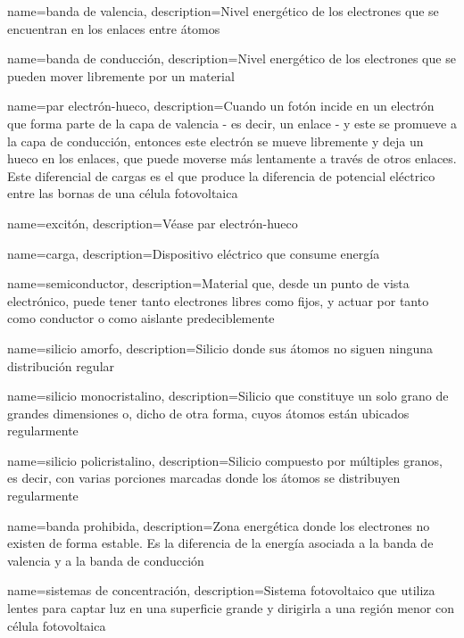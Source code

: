 {
    name={banda de valencia},
    description={Nivel energético de los electrones que se encuentran en los enlaces entre átomos}
}

{
    name={banda de conducción},
    description={Nivel energético de los electrones que se pueden mover libremente por un material}
}

{
    name={par electrón-hueco},
    description={Cuando un fotón incide en un electrón que forma parte de la capa de valencia - es decir, un enlace - y este se promueve a la capa de conducción, entonces este electrón se mueve libremente y deja un hueco en los enlaces, que puede moverse más lentamente a través de otros enlaces. Este diferencial de cargas es el que produce la diferencia de potencial eléctrico entre las bornas de una célula fotovoltaica}
}

{
    name={excitón},
    description={Véase \Gls{par electrón-hueco}}
}

{
    name={carga},
    description={Dispositivo eléctrico que consume energía}
}

{
    name={semiconductor},
    description={Material que, desde un punto de vista electrónico, puede tener tanto electrones libres como fijos, y actuar por tanto como conductor o como aislante predeciblemente}
}

{
    name={silicio amorfo},
    description={Silicio donde sus átomos no siguen ninguna distribución regular}
}

{
    name={silicio monocristalino},
    description={Silicio que constituye un solo grano de grandes dimensiones o, dicho de otra forma, cuyos átomos están ubicados regularmente}
}

{
    name={silicio policristalino},
    description={Silicio compuesto por múltiples granos, es decir, con varias porciones marcadas donde los átomos se distribuyen regularmente}
}

{
    name={banda prohibida},
    description={Zona energética donde los electrones no existen de forma estable. Es la diferencia de la energía asociada a la \gls{banda de valencia} y a la \gls{banda de conducción}}
}

{
    name={sistemas de concentración},
    description={Sistema fotovoltaico que utiliza lentes para captar luz en una superficie grande y dirigirla a una región menor con célula fotovoltaica}
}

